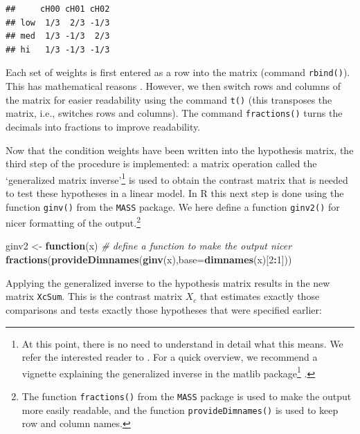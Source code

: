 \documentclass[12pt,]{krantz}
\newenvironment{Shaded}{\begin{snugshade}}{\end{snugshade}}
\newcommand{\CommentTok}[1]{\textcolor[rgb]{0.56,0.35,0.01}{\textit{#1}}}
\newcommand{\ControlFlowTok}[1]{\textcolor[rgb]{0.13,0.29,0.53}{\textbf{#1}}}
\newcommand{\DataTypeTok}[1]{\textcolor[rgb]{0.13,0.29,0.53}{#1}}
\newcommand{\DecValTok}[1]{\textcolor[rgb]{0.00,0.00,0.81}{#1}}
\newcommand{\KeywordTok}[1]{\textcolor[rgb]{0.13,0.29,0.53}{\textbf{#1}}}
\newcommand{\NormalTok}[1]{#1}
\newcommand{\OperatorTok}[1]{\textcolor[rgb]{0.81,0.36,0.00}{\textbf{#1}}}
\newcommand{\StringTok}[1]{\textcolor[rgb]{0.31,0.60,0.02}{#1}}
\renewcommand{\href}[2]{#2\footnote{\url{#1}}}
\theoremstyle{definition}
\theoremstyle{definition}
\theoremstyle{definition}
\theoremstyle{remark}
\begin{document}
\begin{verbatim}
##     cH00 cH01 cH02
## low  1/3  2/3 -1/3
## med  1/3 -1/3  2/3
## hi   1/3 -1/3 -1/3
\end{verbatim}

Each set of weights is first entered as a row into the matrix (command \texttt{rbind()}). This has mathematical reasons \citep[see][]{schad2020capitalize}. However, we then switch rows and columns of the matrix for easier readability using the command \texttt{t()} (this transposes the matrix, i.e., switches rows and columns). The command \texttt{fractions()} turns the decimals into fractions to improve readability.

Now that the condition weights have been written into the hypothesis matrix, the third step of the procedure is implemented: a matrix operation called the `generalized matrix inverse'\footnote{At this point, there is no need to understand in detail what this means. We refer the interested reader to \citet{schad2020capitalize}. For a quick overview, we recommend a vignette explaining the generalized inverse in the \href{https://cran.r-project.org/web/packages/matlib/vignettes/ginv.html}{matlib package} \citep{friendly_matlib}.} is used to obtain the contrast matrix that is needed to test these hypotheses in a linear model.
In R this next step is done using the function \texttt{ginv()} from the \texttt{MASS} package. We here define a function \texttt{ginv2()} for nicer formatting of the output.\footnote{The function \texttt{fractions()} from the \texttt{MASS} package is used to make the output more easily readable, and the function \texttt{provideDimnames()} is used to keep row and column names.}

\begin{Shaded}
\begin{Highlighting}[]
\NormalTok{ginv2 <-}\StringTok{ }\ControlFlowTok{function}\NormalTok{(x) }\CommentTok{# define a function to make the output nicer}
  \KeywordTok{fractions}\NormalTok{(}\KeywordTok{provideDimnames}\NormalTok{(}\KeywordTok{ginv}\NormalTok{(x),}\DataTypeTok{base=}\KeywordTok{dimnames}\NormalTok{(x)[}\DecValTok{2}\OperatorTok{:}\DecValTok{1}\NormalTok{]))}
\end{Highlighting}
\end{Shaded}

Applying the generalized inverse to the hypothesis matrix results in the new matrix \texttt{XcSum}. This is the contrast matrix \(X_c\) that estimates exactly those comparisons and tests exactly those hypotheses that were specified earlier:
\end{document}
